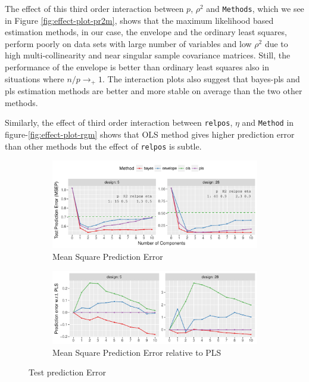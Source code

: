 \documentclass[a4paper, 11pt]{article}
\begin{document}
The effect of this third order interaction between $p$, $\rho^2$ and {\tt Methods}, which we see in Figure \ref{fig:effect-plot-pr2m}, shows that the maximum likelihood based estimation methods, in our case, the envelope and the ordinary least squares, perform poorly on data sets with large number of variables and low $\rho^2$ due to high multi-collinearity and near singular sample covariance matrices. Still, the performance of the envelope is better than ordinary least squares also in situations where $n/p \rightarrow_{+} 1$. The interaction plots also suggest that bayes-pls and pls estimation methods are better and more stable on average than the two other methods.

Similarly, the effect of third order interaction between {\tt relpos}, $\eta$ and {\tt Method} in figure-\ref{fig:effect-plot-rgm} shows that OLS method gives higher prediction error than other methods but the effect of {\tt relpos} is subtle. 

\begin{figure}[!ht]
  \begin{subfigure}[b]{\textwidth}
    \centering
    \includegraphics[width=\textwidth]{prediction-error-selected.pdf}
    \caption{Mean Square Prediction Error}
    \label{fig:prediction-error}
  \end{subfigure}
  \begin{subfigure}[b]{\textwidth}
    \centering
    \includegraphics[width=\textwidth]{prediction-error-pls-selected.pdf}
    \caption{Mean Square Prediction Error relative to PLS}
    \label{fig:prediction-error-pls}
  \end{subfigure}
  \caption{Test prediction Error}
  \label{fig:pred-error-combined}
\end{figure}
\end{document}
